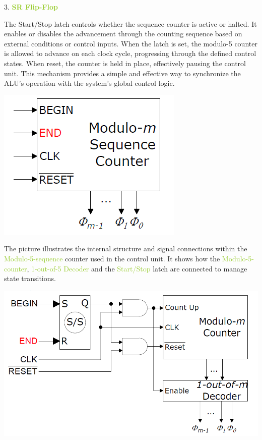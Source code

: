 \documentclass[12pt, letterpaper]{article}
\begin{document}
3. \textcolor{YellowGreen}{\textbf{SR Flip-Flop}}

The Start/Stop latch controls whether the sequence counter is active or halted. It enables or disables the advancement through the counting sequence based on external conditions or control inputs. When the latch is set, the
modulo-5 counter is allowed to advance on each clock cycle, progressing through the defined control states. When reset, the counter is held in place, effectively pausing the control unit. This mechanism provides a simple and
effective way to synchronize the ALU's operation with the system's global control logic.

\begin{center}
\includegraphics[scale=0.3]{Documentation/modulo_counter}
\end{center}

The picture illustrates the internal structure and signal connections within the \textcolor{YellowGreen}{Modulo-5-sequence} counter used in the control unit.
It shows how the \textcolor{YellowGreen}{Modulo-5-counter}, \textcolor{YellowGreen}{1-out-of-5 Decoder} and the \textcolor{YellowGreen}{Start/Stop} latch are connected to
manage state transitions. 


\begin{center}
\includegraphics[scale=0.3]{Documentation/sr}
\end{center}
\end{document}
